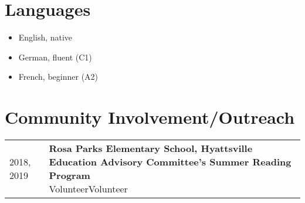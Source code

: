 \documentclass[10pt,a4paper,]{article}
\makeatletter
\providecommand{\tightlist}{%
  \setlength{\itemsep}{0pt}\setlength{\parskip}{0pt}}
\def\detaileditem#1#2#3#4#5{
#2 & \parbox[t]{0.85\textwidth}{%
      \textbf{#1}\hfill{\footnotesize #3}\\
      \ifx#4\empty\else#4\par\fi%
      \ifx#5\empty\else{%
        \vspace{0.1cm}\begin{minipage}{0.7\textwidth}%
        \begin{itemize}#5\end{itemize}%
        \end{minipage}}\fi%
      \vspace{\parsep}}\\}
\def\detailedsection#1{\begin{longtable}{@{\extracolsep{\fill}}ll}#1\end{longtable}}
\makeatother
\begin{document}
\hypertarget{languages}{%
\section{Languages}\label{languages}}

\begin{itemize}
\tightlist
\item
  English, native
\item
  German, fluent (C1)
\item
  French, beginner (A2)
\end{itemize}

\hypertarget{community-involvementoutreach}{%
\section{Community Involvement/Outreach}\label{community-involvementoutreach}}

\detailedsection{\detaileditem{Rosa Parks Elementary School, Hyattsville Education Advisory Committee’s Summer Reading Program}{2018, 2019}{}{Volunteer}{\empty}\detaileditem{Winneconne Elementary School, “Being a scientist and living in a foreign country}{2014}{}{Presenter}{\empty}\detaileditem{Preschool Immersion Event, “Bilingual Language Development
at ASC Kinderbewegungshaus”}{2012}{}{Presenter}{\empty}}
\end{document}
